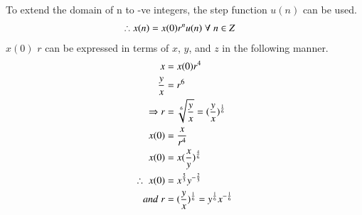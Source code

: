 \documentclass[journal,12pt,twocolumn]{IEEEtran}
\theoremstyle{remark}
\begin{document}
To extend the domain of n to -ve integers, the step function $u(n)$ can be used.
\begin{align}
 \notag    \therefore x(n) &= x(0)r^n u(n) \; \forall \;n\in Z
\end{align}
$x(0)$ $r$ can be expressed in terms of $x$, $y$, and $z$ in the following manner.
\begin{align}
 \notag      x&=x(0)r^4 \\
 \notag    \frac{y}{x}&=r^6 \\
 \Rightarrow r&=\sqrt[6]{\frac{y}{x}}=(\frac{y}{x})^{\frac{1}{6}}\\
 \notag    x(0)&=\frac{x}{r^4}\\
 \notag    x(0)&=x(\frac{x}{y})^{\frac{4}{6}}\\
 \therefore\; x(0)&=x^{\frac{5}{3}}y^{-\frac{2}{3}} \\
 and\; r&=(\frac{y}{x})^{\frac{1}{6}}= y^{\frac{1}{6}}x^{-\frac{1}{6}}
\end{align}
\end{document}
